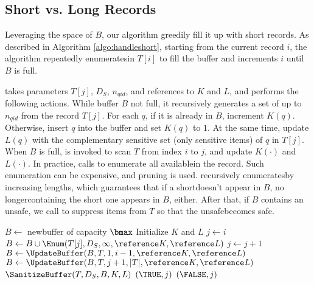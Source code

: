 \subsection{Short vs. Long Records}
Leveraging the space of $B$, our algorithm greedily
fill it up with short records.
As described in Algorithm \ref{algo:handleshort},
starting from the current record $i$, the algorithm repeatedly
enumerates\qids in $T[i]$ to fill the buffer and increments $i$ until $B$ is full.

\Enum takes parameters $T[j]$, $D_S$, $n_{qid}$, and references to $K$ and $L$,
and performs the following
actions. While buffer $B$ not full, it recursively generates a set of
up to $n_{qid}$ \qids from the record $T[j]$.
For each $q$, if it is already in $B$, increment $K(q)$.
Otherwise, insert $q$ into the buffer and set $K(q)$ to $1$.
At the same time, update $L(q)$ with the complementary sensitive set
(only sensitive items) of $q$ in $T[j]$.
When $B$ is full, \UpdateBuffer is invoked to scan $T$ from index $i$ to $j$,
and update $K(\cdot)$ and $L(\cdot)$.
In practice, \UpdateBuffer calls \Enum to
enumerate all available\qids in the record.
Such enumeration can be expensive, and pruning is used.
\Enum recursively enumerates\qids by increasing lengths,
which guarantees that if a short\qid doesn't appear in $B$,
no longer\qids containing the short one appears in $B$, either.
After that, if $B$ contains an unsafe\qidx,
we call \SanitizeBuffer to suppress items from $T$ so that the
unsafe\qid becomes safe.
\begin{algorithm}[th]
\caption{$\HandleShortRecords(\reference T, D_S, i, \bmax)$}
\label{algo:handleshort}
\begin{algorithmic}[1]
    \STATE $B\leftarrow$ new\qid buffer of capacity $\bmax$
    \STATE Initialize $K$ and $L$
    \STATE $j\leftarrow i$
        \STATE $B\leftarrow B\cup\Enum(T[j], D_S, \infty, \reference K, \reference L)$
        \STATE $j\leftarrow j+1$
    \ENDWHILE
    \STATE $B\leftarrow\UpdateBuffer(B,T,1,i-1, \reference K, \reference L)$
    \STATE $B\leftarrow\UpdateBuffer(B,T,j+1,|T|, \reference K, \reference L)$
     \label{line:handle-short-if-contains-unsafe}
        \STATE $\SanitizeBuffer(T, D_S, B, K, L)$
        \STATE \RETURN $(\TRUE,j)$
    \ELSE
        \STATE \RETURN $(\FALSE,j)$ \label{line:handle-short-return-false}
    \ENDIF
\end{algorithmic}
\end{algorithm}

